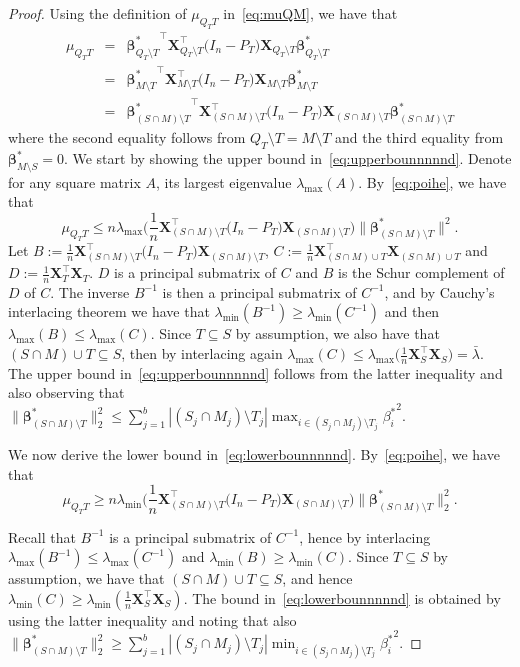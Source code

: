 \documentclass[
  12pt]{article}
\newcommand{\bbeta}{\boldsymbol{\beta}}
\newcommand{\bX}{\mathbf{X}}
\begin{document}
\begin{proof}
Using the definition of $\mu_{Q_T T}$ in~\eqref{eq:muQM}, we have that 
\begin{eqnarray}
    \mu_{Q_TT}&=&{\bbeta^*_{Q_T\setminus T}}^{\top}\bX_{Q_T\setminus T}^{\top}  \big(I_n-P_T\big) \bX_{Q_T\setminus T} \bbeta^*_{Q_T\setminus T}\nonumber\\
    &=&{\bbeta^*_{M\setminus T}}^{\top}\bX_{M\setminus T}^{\top}  \big(I_n-P_T\big) \bX_{M\setminus T} \bbeta^*_{M\setminus T}\nonumber\\
    &=&{\bbeta^*_{(S\cap M)\setminus T}}^{\top}\bX_{(S\cap M)\setminus T}^{\top}  \big(I_n-P_T\big) \bX_{(S\cap M)\setminus T} \bbeta^*_{(S\cap M)\setminus T}\label{eq:poihe}
\end{eqnarray}
where the second equality follows from $Q_T\setminus T =M\setminus T $ and the third equality from $\bbeta^*_{M\setminus S}=0$.
We start by showing the upper bound in~\eqref{eq:upperbounnnnnd}. Denote for any square matrix $A$, its largest eigenvalue 
$\lambda_{\max}(A)$. By~\eqref{eq:poihe}, we have that
$$\mu_{Q_TT}\leq n\lambda_{\max}\Big(\frac{1}{n}\bX_{(S\cap M)\setminus T}^{\top}  \big(I_n-P_T\big) \bX_{(S\cap M)\setminus T}\Big) \|\bbeta^*_{(S\cap M)\setminus T}\|^2.$$
Let $B:=\tfrac{1}{n}\bX_{(S\cap M)\setminus T}^{\top}  \big(I_n-P_T\big) \bX_{(S\cap M)\setminus T}$, $C:=\tfrac{1}{n}\bX_{(S\cap M)\cup T}^{\top}\bX_{(S\cap M)\cup T}$ and $D:=\tfrac{1}{n}\bX_T^{\top} \bX_T$. $D$ is a principal submatrix of $C$ and $B$ is the Schur complement of $D$ of $C$. The inverse $B^{-1}$ is then a principal submatrix of $C^{-1}$, and by Cauchy's interlacing theorem we have that   $\lambda_{\min}(B^{-1})\geq \lambda_{\min}(C^{-1})$ and then $\lambda_{\max}(B)\leq \lambda_{\max}(C)$. Since $T \subseteq S$ by assumption, we also have that $(S\cap M)\cup T \subseteq S$, then by interlacing again $\lambda_{\max}(C)\leq \lambda_{\max}\Big(\tfrac{1}{n}\bX_S^{\top}\bX_S\Big)=\bar{\lambda}$. The upper bound in~\eqref{eq:upperbounnnnnd} follows from the latter inequality and also observing that $\|\bbeta^*_{(S\cap M)\setminus T}\|_2^2\leq \sum_{j=1}^b |(S_j\cap M_j)\setminus T_j|\max_{i\in (S_j\cap M_j)\setminus T_j}{\beta_i^*}^2$.

We now derive the lower bound in~\eqref{eq:lowerbounnnnnd}. By~\eqref{eq:poihe}, we have that 
$$\mu_{Q_TT}\geq n\lambda_{\min}\Big(\frac{1}{n}\bX_{(S\cap M)\setminus T}^{\top}  \big(I_n-P_T\big) \bX_{(S\cap M)\setminus T}\Big) \|\bbeta^*_{(S\cap M)\setminus T}\|_2^2.$$

Recall that $B^{-1}$ is a principal submatrix of $C^{-1}$, hence by interlacing $\lambda_{\max}(B^{-1})\leq \lambda_{\max}(C^{-1})$ and $\lambda_{\min}(B)\geq \lambda_{\min}(C)$. Since $T \subseteq S$ by assumption, we have that $(S\cap M)\cup T \subseteq S$, and hence $\lambda_{\min}(C)\geq\lambda_{\min}(\frac{1}{n}\bX_S^{\top} \bX_S)$.
The bound in~\eqref{eq:lowerbounnnnnd} is obtained by using the latter inequality and noting that also $\|\bbeta^*_{(S\cap M)\setminus T}\|_2^2\geq \sum_{j=1}^b |(S_j\cap M_j)\setminus T_j|\min_{i\in (S_j\cap M_j)\setminus T_j}{\beta_i^*}^2.$
\end{proof}
\end{document}
